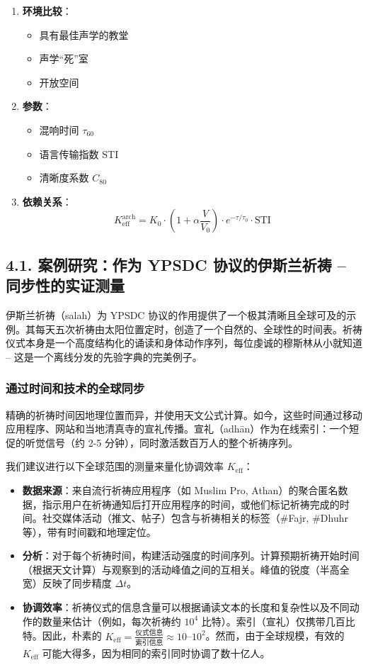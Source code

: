 \documentclass[12pt,a4paper]{article}
\newcommand{\Keff}{K_{\mathrm{eff}}}   %
\begin{document}
	\begin{enumerate}
		\item \textbf{环境比较}：
		\begin{itemize}
			\item 具有最佳声学的教堂
			\item 声学“死”室
			\item 开放空间
		\end{itemize}
		\item \textbf{参数}：
		\begin{itemize}
			\item 混响时间 $\tau_{60}$
			\item 语言传输指数 STI
			\item 清晰度系数 $C_{80}$
		\end{itemize}
		\item \textbf{依赖关系}：
		\[
		K_{\mathrm{eff}}^{\mathrm{arch}} = K_0 \cdot \left(1 + \alpha \frac{V}{V_0}\right) \cdot e^{-\tau/\tau_0} \cdot \mathrm{STI}
		\]
	\end{enumerate}
	
	\subsection{4.1. 案例研究：作为 YPSDC 协议的伊斯兰祈祷 – 同步性的实证测量}
	\label{subsec:islamic_prayer}
	
	伊斯兰祈祷（salah）为 YPSDC 协议的作用提供了一个极其清晰且全球可及的示例。其每天五次祈祷由太阳位置定时，创造了一个自然的、全球性的时间表。祈祷仪式本身是一个高度结构化的诵读和身体动作序列，每位虔诚的穆斯林从小就知道 – 这是一个离线分发的先验字典的完美例子。
	
	\subsubsection{通过时间和技术的全球同步}
	精确的祈祷时间因地理位置而异，并使用天文公式计算。如今，这些时间通过移动应用程序、网站和当地清真寺的宣礼传播。宣礼（adhān）作为在线索引：一个短促的听觉信号（约 2-5 分钟），同时激活数百万人的整个祈祷序列。
	
	我们建议进行以下全球范围的测量来量化协调效率 \(\Keff\)：
	\begin{itemize}
		\item \textbf{数据来源}：来自流行祈祷应用程序（如 Muslim Pro, Athan）的聚合匿名数据，指示用户在祈祷通知后打开应用程序的时间，或他们标记祈祷完成的时间。社交媒体活动（推文、帖子）包含与祈祷相关的标签（\#Fajr, \#Dhuhr 等），带有时间戳和地理定位。
		\item \textbf{分析}：对于每个祈祷时间，构建活动强度的时间序列。计算预期祈祷开始时间（根据天文计算）与观察到的活动峰值之间的互相关。峰值的锐度（半高全宽）反映了同步精度 \(\Delta t\)。
		\item \textbf{协调效率}：祈祷仪式的信息含量可以根据诵读文本的长度和复杂性以及不同动作的数量来估计（例如，每次祈祷约 \(10^4\) 比特）。索引（宣礼）仅携带几百比特。因此，朴素的 \(\Keff = \frac{\text{仪式信息}}{\text{索引信息}} \approx 10\)–\(10^2\)。然而，由于全球规模，有效的 \(\Keff\) 可能大得多，因为相同的索引同时协调了数十亿人。
	\end{itemize}
	
\end{document}
